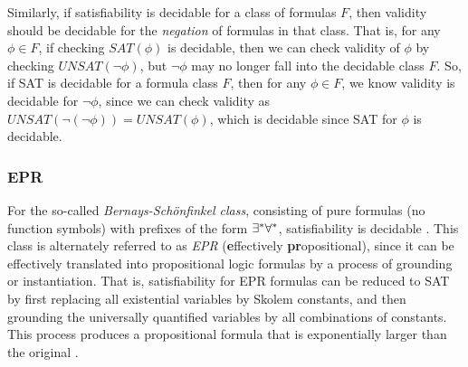 \documentclass[10pt]{article}
\begin{document}
Similarly, if satisfiability is decidable for a class of formulas $F$, then validity should be decidable for the \textit{negation} of formulas in that class. That is, for any $\phi \in F$, if  checking $SAT(\phi)$ is decidable, then we can check validity of $\phi$ by checking $UNSAT(\neg \phi)$, but $\neg \phi$ may no longer fall into the decidable class $F$. So, if SAT is decidable for a formula class $F$, then for any $\phi \in F$, we know validity is decidable for $\neg \phi$, since we can check validity as $UNSAT(\neg (\neg \phi))=UNSAT(\phi)$, which is decidable since SAT for $\phi$ is decidable.




\subsubsection{EPR}

For the so-called \textit{Bernays-Sch\"{o}nfinkel class}, consisting of pure formulas (no function symbols) with prefixes of the form $\exists^*\forall^*$, satisfiability is decidable \cite{lewis1980complexity}. This class is alternately referred to as \textit{EPR} (\textbf{e}ffectively \textbf{pr}opositional), since it can be effectively translated into propositional logic formulas by a process of grounding or instantiation. That is, satisfiability for EPR formulas can be reduced to SAT by first replacing all existential variables by Skolem constants, and then grounding the universally quantified variables by all combinations of constants. This process produces a propositional formula that is exponentially larger than the original \cite{demoura2008deciding}. 
\end{document}
